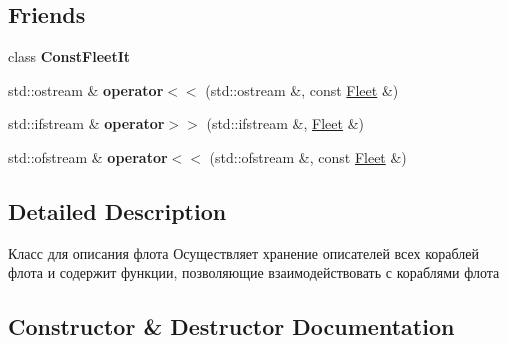 \subsection*{Friends}
\begin{DoxyCompactItemize}
\item 
\mbox{\label{class_aircraft_carrier_group_1_1_fleet_ab159448042fb03231f44572ef8fd8075}} 
class {\bfseries Const\+Fleet\+It}
\item 
\mbox{\label{class_aircraft_carrier_group_1_1_fleet_a21e2b274d6ab3bd444ecfeab143cd7e2}} 
std\+::ostream \& {\bfseries operator$<$$<$} (std\+::ostream \&, const \mbox{\hyperlink{class_aircraft_carrier_group_1_1_fleet}{Fleet}} \&)
\item 
\mbox{\label{class_aircraft_carrier_group_1_1_fleet_ab81d2a31c8119517e381beab290f58fa}} 
std\+::ifstream \& {\bfseries operator$>$$>$} (std\+::ifstream \&, \mbox{\hyperlink{class_aircraft_carrier_group_1_1_fleet}{Fleet}} \&)
\item 
\mbox{\label{class_aircraft_carrier_group_1_1_fleet_ace3fe0aa2dcee997b91fddf929e4f021}} 
std\+::ofstream \& {\bfseries operator$<$$<$} (std\+::ofstream \&, const \mbox{\hyperlink{class_aircraft_carrier_group_1_1_fleet}{Fleet}} \&)
\end{DoxyCompactItemize}


\subsection{Detailed Description}
Класс для описания флота  Осуществляет хранение описателей всех кораблей флота и содержит функции, позволяющие взаимодействовать с кораблями флота 

\subsection{Constructor \& Destructor Documentation}
\mbox{\label{class_aircraft_carrier_group_1_1_fleet_afd8802987a6ff91b25cba30a140cc57a}} 
